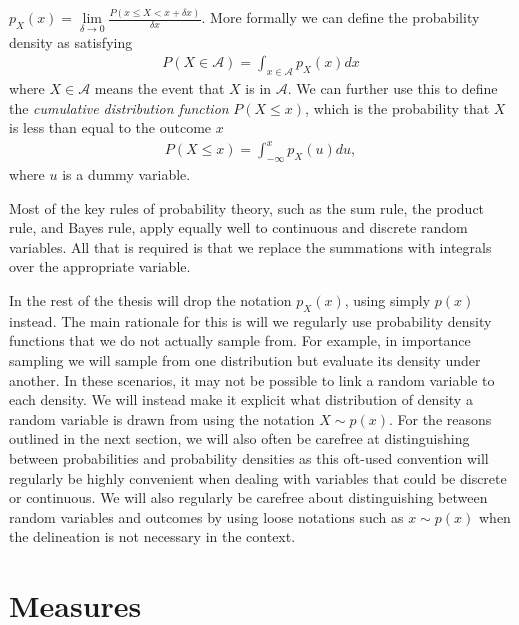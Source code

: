 $p_{X}(x) = \lim\limits_{\delta\rightarrow0} \frac{P(x\le X <x+\delta x)}{\delta x}$.  More formally
we can define the probability density as satisfying
\begin{align}
\label{eq:prob:density}
P(X\in \mathcal{A}) = \int_{x\in\mathcal{A}} p_{X}(x) dx
\end{align}
where $X\in \mathcal{A}$ means the event that $X$ is in $\mathcal{A}$.  We can further
use this to define the \emph{cumulative distribution function} $P(X\le x)$, which is the probability
that $X$ is less than equal to the outcome $x$
\begin{align}
\label{eq:prob:cumulative}
P(X\le x) = \int_{-\infty}^{x} p_{X}(u) du,
\end{align}
where $u$ is a dummy variable.

Most of the key rules of probability theory, such as the sum rule, the product rule, and Bayes
rule, apply equally well to continuous and discrete random variables.  All that is required
is that we replace the summations with integrals over the appropriate variable. 

In the rest of the thesis will drop the notation $p_{X}(x)$, using simply $p(x)$ instead.
The main rationale for this is will we regularly use probability density functions that we do
not actually sample from.  For example, in importance sampling we will sample from one
distribution but evaluate its density under another.  In these scenarios, it may not be possible
to link a random variable to each density.  We will instead make it explicit what distribution
of density a random variable is drawn from using the notation $X\sim p(x)$.  For the reasons
outlined in the next section, we will also often be carefree at distinguishing between probabilities
and probability densities as this oft-used convention will regularly be highly convenient when
dealing with variables that could be discrete or continuous.  We will also regularly be carefree about
distinguishing between random variables and outcomes by using loose notations such as
$x\sim p(x)$ when the delineation is not necessary in the context.


\section{Measures}
\label{sec:prob:measure}

